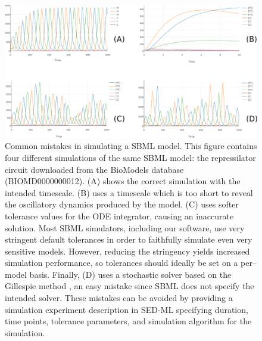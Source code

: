 \documentclass[10pt,letterpaper]{article}
\begin{document}
\begin{figure}
  \includegraphics[width=\textwidth]{elowitz-simulations.pdf}
  \caption{ Common mistakes in simulating a SBML model. This figure contains four different simulations of the same SBML model: the repressilator circuit \cite{elowitz2000synthetic} downloaded from the BioModels database (BIOMD0000000012). (A) shows the correct simulation with the intended timescale. (B) uses a timescale which is too short to reveal the oscillatory dynamics produced by the model. (C) uses softer tolerance values for the ODE integrator, causing an inaccurate solution. Most SBML simulators, including our software, use very stringent default tolerances in order to faithfully simulate even very sensitive models. However, reducing the stringency yields increased simulation performance, so tolerances should ideally be set on a per--model basis. Finally, (D) uses a stochastic solver based on the Gillespie method \cite{gillespie1977exact}, an easy mistake since SBML does not specify the intended solver. These mistakes can be avoided by providing a simulation experiment description in SED-ML specifying duration, time points, tolerance parameters, and simulation algorithm for the simulation. }
  \label{fig:mistakes}
\end{figure}
\end{document}
